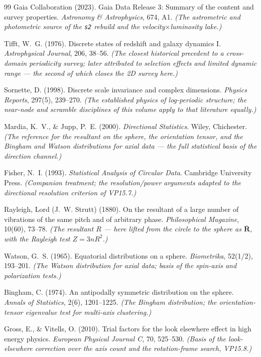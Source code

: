 \documentclass[11pt, letterpaper, openany]{book}
\newcommand{\Rbar}{\bar{\mathbf{R}}}
\begin{document}
\begin{thebibliography}{99}
Gaia Collaboration (2023).
Gaia Data Release 3: Summary of the content and survey properties.
\textit{Astronomy \& Astrophysics}, 674, A1.
\textit{(The astrometric and photometric source of the \texttt{s2} rebuild and the
velocity$\times$luminosity lake.)}

Tifft, W.~G. (1976).
Discrete states of redshift and galaxy dynamics I.
\textit{Astrophysical Journal}, 206, 38--56.
\textit{(The closest historical precedent to a cross-domain periodicity survey; later attributed to
selection effects and limited dynamic range --- the second of which closes the 2D survey here.)}

Sornette, D. (1998).
Discrete scale invariance and complex dimensions.
\textit{Physics Reports}, 297(5), 239--270.
\textit{(The established physics of log-periodic structure; the near-node and scramble disciplines of
this volume apply to that literature equally.)}

Mardia, K.~V., \& Jupp, P.~E. (2000).
\textit{Directional Statistics}. Wiley, Chichester.
\textit{(The reference for the resultant on the sphere, the orientation tensor, and the Bingham and Watson
distributions for axial data --- the full statistical basis of the direction channel.)}

Fisher, N.~I. (1993).
\textit{Statistical Analysis of Circular Data}. Cambridge University Press.
\textit{(Companion treatment; the resolution/power arguments adapted to the directional resolution criterion
of VP15.7.)}

Rayleigh, Lord (J.~W. Strutt) (1880).
On the resultant of a large number of vibrations of the same pitch and of arbitrary phase.
\textit{Philosophical Magazine}, 10(60), 73--78.
\textit{(The resultant $R$ --- here lifted from the circle to the sphere as $\Rbar$, with the Rayleigh test
$Z = 3nR^2$.)}

Watson, G.~S. (1965).
Equatorial distributions on a sphere.
\textit{Biometrika}, 52(1/2), 193--201.
\textit{(The Watson distribution for axial data; basis of the spin-axis and polarization tests.)}

Bingham, C. (1974).
An antipodally symmetric distribution on the sphere.
\textit{Annals of Statistics}, 2(6), 1201--1225.
\textit{(The Bingham distribution; the orientation-tensor eigenvalue test for multi-axis clustering.)}

Gross, E., \& Vitells, O. (2010).
Trial factors for the look elsewhere effect in high energy physics.
\textit{European Physical Journal C}, 70, 525--530.
\textit{(Basis of the look-elsewhere correction over the axis count and the rotation-frame search, VP15.8.)}


\end{thebibliography}
\end{document}
